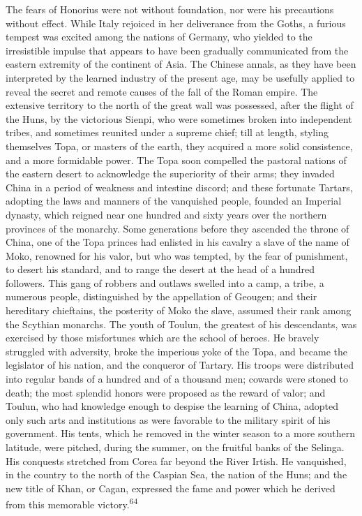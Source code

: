 The fears of Honorius were not without foundation, nor were his
precautions without effect. While Italy rejoiced in her
deliverance from the Goths, a furious tempest was excited among
the nations of Germany, who yielded to the irresistible impulse
that appears to have been gradually communicated from the eastern
extremity of the continent of Asia. The Chinese annals, as they
have been interpreted by the learned industry of the present age,
may be usefully applied to reveal the secret and remote causes of
the fall of the Roman empire. The extensive territory to the
north of the great wall was possessed, after the flight of the
Huns, by the victorious Sienpi, who were sometimes broken into
independent tribes, and sometimes reunited under a supreme chief;
till at length, styling themselves Topa, or masters of the earth,
they acquired a more solid consistence, and a more formidable
power. The Topa soon compelled the pastoral nations of the
eastern desert to acknowledge the superiority of their arms; they
invaded China in a period of weakness and intestine discord; and
these fortunate Tartars, adopting the laws and manners of the
vanquished people, founded an Imperial dynasty, which reigned
near one hundred and sixty years over the northern provinces of
the monarchy. Some generations before they ascended the throne of
China, one of the Topa princes had enlisted in his cavalry a
slave of the name of Moko, renowned for his valor, but who was
tempted, by the fear of punishment, to desert his standard, and
to range the desert at the head of a hundred followers. This gang
of robbers and outlaws swelled into a camp, a tribe, a numerous
people, distinguished by the appellation of Geougen; and their
hereditary chieftains, the posterity of Moko the slave, assumed
their rank among the Scythian monarchs. The youth of Toulun, the
greatest of his descendants, was exercised by those misfortunes
which are the school of heroes. He bravely struggled with
adversity, broke the imperious yoke of the Topa, and became the
legislator of his nation, and the conqueror of Tartary. His
troops were distributed into regular bands of a hundred and of a
thousand men; cowards were stoned to death; the most splendid
honors were proposed as the reward of valor; and Toulun, who had
knowledge enough to despise the learning of China, adopted only
such arts and institutions as were favorable to the military
spirit of his government. His tents, which he removed in the
winter season to a more southern latitude, were pitched, during
the summer, on the fruitful banks of the Selinga. His conquests
stretched from Corea far beyond the River Irtish. He vanquished,
in the country to the north of the Caspian Sea, the nation of the
Huns; and the new title of Khan, or Cagan, expressed the fame and
power which he derived from this memorable victory.\textsuperscript{64}

